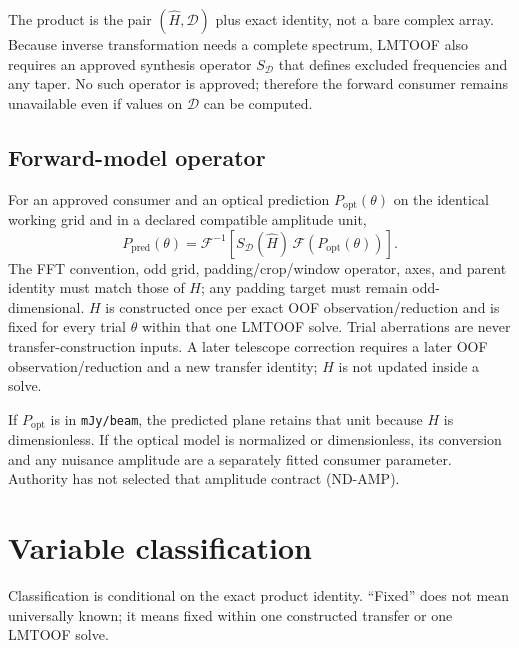 \documentclass[11pt]{article}
\newcommand{\FFT}{\mathcal{F}}
\newcommand{\IFFT}{\mathcal{F}^{-1}}
\begin{document}
The product is the pair $(\widehat H,\mathcal D)$ plus exact identity, not a
bare complex array.  Because inverse transformation needs a complete spectrum,
LMTOOF also requires an approved synthesis operator $S_{\mathcal D}$ that
defines excluded frequencies and any taper.  No such operator is approved;
therefore the forward consumer remains unavailable even if values on
$\mathcal D$ can be computed.

\subsection{Forward-model operator}

For an approved consumer and an optical prediction
$P_{\mathrm{opt}}(\theta)$ on the identical working grid and in a declared
compatible amplitude unit,
\begin{equation}
 P_{\mathrm{pred}}(\theta)=
 \IFFT\!\left[S_{\mathcal D}(\widehat H)\,
 \FFT\!\left(P_{\mathrm{opt}}(\theta)\right)\right].
 \label{eq:forward}
\end{equation}
The FFT convention, odd grid, padding/crop/window operator, axes, and parent
identity must match those of $H$; any padding target must remain
odd-dimensional.  $H$ is constructed once per exact OOF
observation/reduction and is fixed for every trial $\theta$ within that one
LMTOOF solve.  Trial aberrations are never transfer-construction inputs.  A
later telescope correction requires a later OOF observation/reduction and a
new transfer identity; $H$ is not updated inside a solve.

If $P_{\mathrm{opt}}$ is in \texttt{mJy/beam}, the predicted plane retains
that unit because $H$ is dimensionless.  If the optical model is normalized or
dimensionless, its conversion and any nuisance amplitude are a separately
fitted consumer parameter.  Authority has not selected that amplitude
contract (ND-AMP).

\section{Variable classification}

Classification is conditional on the exact product identity.  ``Fixed'' does
not mean universally known; it means fixed within one constructed transfer or
one LMTOOF solve.
\end{document}
